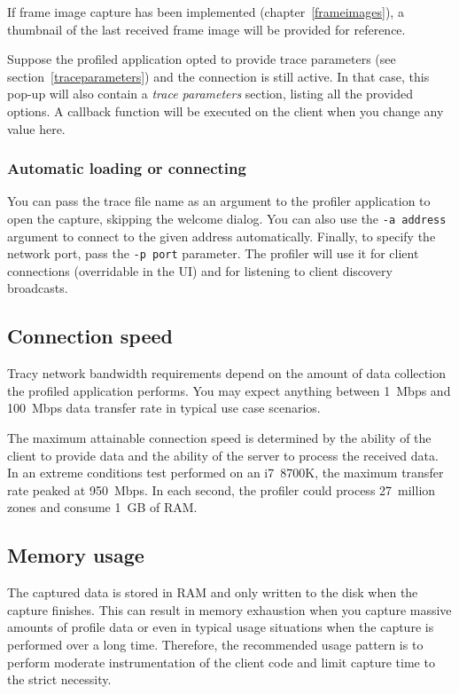 \documentclass[hidelinks,titlepage,a4paper,twoside]{article}
\begin{document}
If frame image capture has been implemented (chapter~\ref{frameimages}), a thumbnail of the last received frame image will be provided for reference.

Suppose the profiled application opted to provide trace parameters (see section~\ref{traceparameters}) and the connection is still active. In that case, this pop-up will also contain a \emph{trace parameters} section, listing all the provided options. A callback function will be executed on the client when you change any value here.

\subsubsection{Automatic loading or connecting}

You can pass the trace file name as an argument to the profiler application to open the capture, skipping the welcome dialog. You can also use the \texttt{-a address} argument to connect to the given address automatically. Finally, to specify the network port, pass the \texttt{-p port} parameter. The profiler will use it for client connections (overridable in the UI) and for listening to client discovery broadcasts.

\subsection{Connection speed}

Tracy network bandwidth requirements depend on the amount of data collection the profiled application performs. You may expect anything between 1~Mbps and 100~Mbps data transfer rate in typical use case scenarios.

The maximum attainable connection speed is determined by the ability of the client to provide data and the ability of the server to process the received data. In an extreme conditions test performed on an i7~8700K, the maximum transfer rate peaked at 950~Mbps. In each second, the profiler could process 27~million zones and consume 1~GB of RAM.

\subsection{Memory usage}
\label{memoryusage}

The captured data is stored in RAM and only written to the disk when the capture finishes. This can result in memory exhaustion when you capture massive amounts of profile data or even in typical usage situations when the capture is performed over a long time. Therefore, the recommended usage pattern is to perform moderate instrumentation of the client code and limit capture time to the strict necessity.
\end{document}
